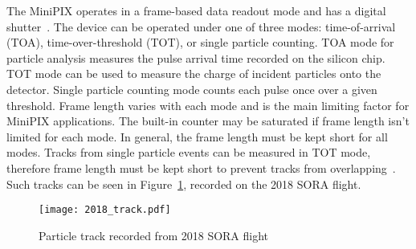 The MiniPIX operates in a frame-based data readout mode and has a digital shutter~\cite{stuartthesis}. The device can be operated under one of three modes: time-of-arrival (TOA), time-over-threshold (TOT), or single particle counting.  TOA mode for particle analysis measures the pulse arrival time recorded on the silicon chip.  TOT mode can be used to measure the charge of incident particles onto the detector.  Single particle counting mode counts each pulse once over a given threshold. Frame length varies with each mode and is the main limiting factor for MiniPIX applications.  The built-in counter may be saturated if frame length isn't limited for each mode.  In general, the frame length must be kept short for all modes.  Tracks from single particle events can be measured in TOT mode, therefore frame length must be kept short to prevent tracks from overlapping~\cite{stuartthesis}.  Such tracks can be seen in Figure~\ref{fig:sample_2018}, recorded on the 2018 SORA flight.
%
\begin{figure}[H] %
    \centering
    \texttt{[image: 2018\_track.pdf]} 
    \caption{Particle track recorded from 2018 SORA flight}
    \label{fig:sample_2018}
\end{figure}

